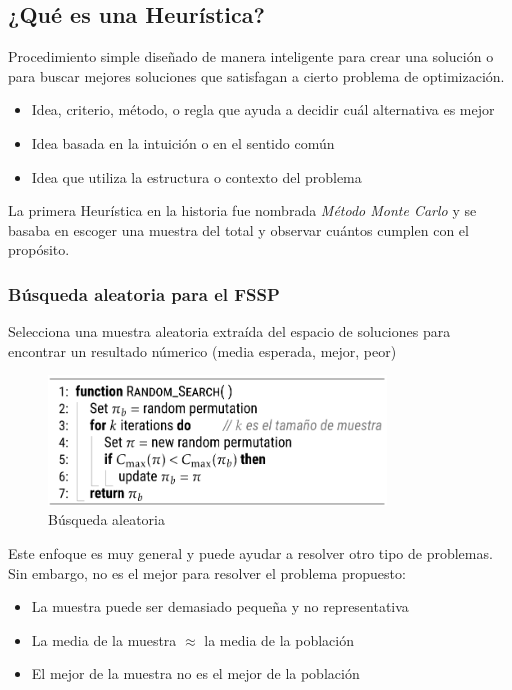 \documentclass[10pt, a4paper]{article}
\begin{document}
\subsection{¿Qué es una Heurística?}

Procedimiento simple diseñado de manera inteligente para crear una solución o 
para buscar mejores soluciones que satisfagan a cierto problema de optimización.

\begin{itemize}
  \item Idea, criterio, método, o regla que ayuda a decidir cuál alternativa 
    es mejor
  \item Idea basada en la intuición o en el sentido común
  \item Idea que utiliza la estructura o contexto del problema
\end{itemize}

La primera Heurística en la historia fue nombrada \textit{Método Monte Carlo} y se 
basaba en escoger una muestra del total y observar cuántos cumplen con el propósito.

\subsubsection{Búsqueda aleatoria para el FSSP}

Selecciona una muestra aleatoria extraída del espacio de soluciones para encontrar
un resultado númerico (media esperada, mejor, peor)

\begin{figure}[H]
  \centering
  \includegraphics[width=0.8\textwidth]{./.github/1733241212.png}
  \caption{Búsqueda aleatoria}\label{fig:random-search}
\end{figure}

Este enfoque es muy general y puede ayudar a resolver otro tipo de problemas. Sin
embargo, no es el mejor para resolver el problema propuesto:

\begin{itemize}
  \item La muestra puede ser demasiado pequeña y no representativa
  \item La media de la muestra $\approx$ la media de la población
  \item El mejor de la muestra no es el mejor de la población
\end{itemize}
\end{document}
